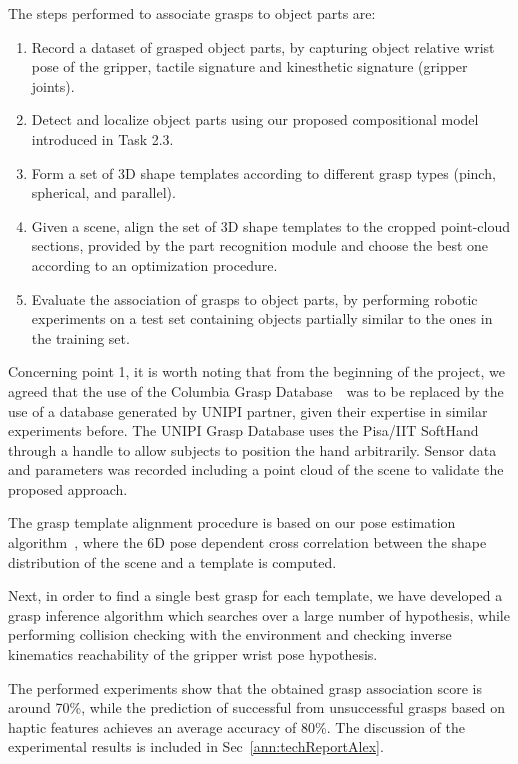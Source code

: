 \documentclass[a4paper,11pt,pdf]{pacmanreport}
\begin{document}
The steps performed to associate grasps to object parts are:
\begin{enumerate}
\item Record a dataset of grasped object parts, by capturing object relative wrist pose of the gripper, tactile signature and kinesthetic signature (gripper joints).
\item Detect and localize object parts using our proposed compositional model introduced in Task 2.3.
\item Form a set of 3D shape templates according to different grasp types (pinch, spherical, and parallel).
\item Given a scene, align the set of 3D shape templates to the cropped point-cloud sections, provided by the part recognition module and choose the best one according to an optimization procedure.
\item Evaluate the association of grasps to object parts, by performing robotic experiments on a test set containing objects partially similar to the ones in the training set.
\end{enumerate}

Concerning point 1, it is worth noting that from the beginning of the project, we agreed that the use of the Columbia Grasp Database~\ was to be replaced by the use of a database generated by UNIPI partner, given their expertise in similar experiments before. The UNIPI Grasp Database uses the Pisa/IIT SoftHand through a handle to allow subjects to position the hand arbitrarily.
Sensor data and parameters was recorded including a point cloud of the scene to validate the proposed approach.

The grasp template alignment procedure is based on our pose estimation algorithm~\cite{detry2010ac}, where the 6D pose dependent cross correlation between the shape distribution of the scene and a template is computed.

Next, in order to find a single best grasp for each template, we have developed a grasp inference algorithm which searches over a large number of hypothesis, while performing collision checking with the environment and checking inverse kinematics reachability of the gripper wrist pose hypothesis.

The performed experiments show that the obtained grasp association score is around 70\%, 
while the prediction of successful from unsuccessful grasps based on haptic 
features achieves an average accuracy of 80\%. The discussion of the 
experimental results is included in Sec~\ref{ann:techReportAlex}.
\end{document}
